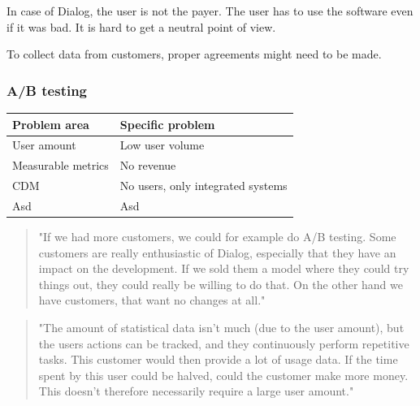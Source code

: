 \documentclass[english]{tktltiki2}
\theoremstyle{definition}
\theoremstyle{remark}
\begin{document}
In case of Dialog, the user is not the payer. The user has to use the software even if it was bad. It is hard to get a neutral point of view. 

To collect data from customers, proper agreements might need to be made.


\subsubsection{A/B testing}

\begin{center}
    \begin{tabular}{ | l | p{5cm} |}
    \hline
    Problem area & Specific problem \\ \hline
    User amount & Low user volume \\ \hline
    Measurable metrics & No revenue \\ \hline
	CDM & No users, only integrated systems \\ \hline
	Asd & Asd \\
    \hline
    \end{tabular}
\end{center}

\begin{quote}
"If we had more customers, we could for example do A/B testing. Some customers are really enthusiastic of Dialog, especially that they have an impact on the development. If we sold them a model where they could try things out, they could really be willing to do that. On the other hand we have customers, that want no changes at all."
\end{quote}


\begin{quote}
"The amount of statistical data isn't much (due to the user amount), but the users actions can be tracked, and they continuously perform repetitive tasks. This customer would then provide a lot of usage data. If the time spent by this user could be halved, could the customer make more money. This doesn't therefore necessarily require a large user amount."
\end{quote}
\end{document}
